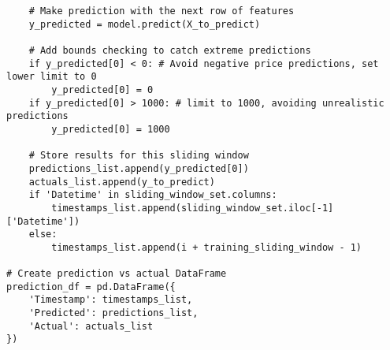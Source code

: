 \documentclass[12pt]{report} %
\begin{document}
\begin{lstlisting}
    # Make prediction with the next row of features
    y_predicted = model.predict(X_to_predict)

    # Add bounds checking to catch extreme predictions
    if y_predicted[0] < 0: # Avoid negative price predictions, set lower limit to 0
        y_predicted[0] = 0
    if y_predicted[0] > 1000: # limit to 1000, avoiding unrealistic predictions
        y_predicted[0] = 1000

    # Store results for this sliding window
    predictions_list.append(y_predicted[0])
    actuals_list.append(y_to_predict)
    if 'Datetime' in sliding_window_set.columns:
        timestamps_list.append(sliding_window_set.iloc[-1]['Datetime'])
    else:
        timestamps_list.append(i + training_sliding_window - 1)

# Create prediction vs actual DataFrame
prediction_df = pd.DataFrame({
    'Timestamp': timestamps_list,
    'Predicted': predictions_list,
    'Actual': actuals_list
})
\end{lstlisting}
\end{document}
